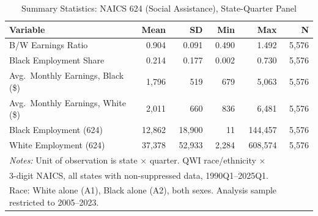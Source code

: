 \begin{table}[t]
\centering
\caption{Summary Statistics: NAICS 624 (Social Assistance), State-Quarter Panel}
\label{tab:sumstats}
\begin{tabular}{lrrrrr}
\hline\hline
Variable & Mean & SD & Min & Max & N \\
\hline
B/W Earnings Ratio & 0.904 & 0.091 & 0.490 & 1.492 & 5,576 \\
Black Employment Share & 0.214 & 0.177 & 0.002 & 0.730 & 5,576 \\
Avg.\ Monthly Earnings, Black (\$) & 1,796 & 519 & 679 & 5,063 & 5,576 \\
Avg.\ Monthly Earnings, White (\$) & 2,011 & 660 & 836 & 6,481 & 5,576 \\
Black Employment (624) & 12,862 & 18,900 & 11 & 144,457 & 5,576 \\
White Employment (624) & 37,378 & 52,933 & 2,284 & 608,574 & 5,576 \\
\hline
\multicolumn{6}{l}{\footnotesize \textit{Notes:} Unit of observation is state $\times$ quarter. QWI race/ethnicity $\times$}\\
\multicolumn{6}{l}{\footnotesize 3-digit NAICS, all states with non-suppressed data, 1990Q1--2025Q1.}\\
\multicolumn{6}{l}{\footnotesize Race: White alone (A1), Black alone (A2), both sexes. Analysis sample restricted to 2005--2023.}\\
\hline\hline
\end{tabular}
\end{table}
